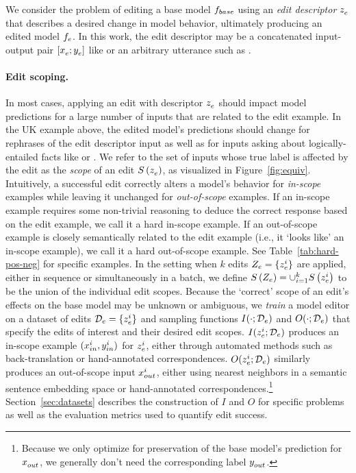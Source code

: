 \documentclass{article}
\begin{document}

We consider the problem of editing a base model $\basemodel$ using an \textit{edit descriptor} $\ze$ that describes a desired change in model behavior, ultimately producing an edited model $\editedmodel$. In this work, the edit descriptor may be a concatenated input-output pair $\editpair$ like  or an arbitrary utterance such as .%



\paragraph{Edit scoping.} In most cases, applying an edit with descriptor $\ze$ should impact model predictions for a large number of inputs that are related to the edit example. In the UK example above, the edited model's predictions should change for rephrases of the edit descriptor input as well as for inputs asking about logically-entailed facts like  or . We refer to the set of inputs whose true label is affected by the edit as the \textit{scope} of an edit $\scope{\ze}$, as visualized in Figure~\ref{fig:equiv}. Intuitively, a successful edit correctly alters a model's behavior for \textit{in-scope} examples while leaving it unchanged for \textit{out-of-scope} examples. If an in-scope example requires some non-trivial reasoning to deduce the correct response based on the edit example, we call it a hard in-scope example. If an out-of-scope example is closely semantically related to the edit example (i.e., it `looks like' an in-scope example), we call it a hard out-of-scope example. See Table~\ref{tab:hard-pos-neg} for specific examples. In the setting when $k$ edits $\edits = \{\ze[i]\}$ are applied, either in sequence or simultaneously in a batch, we define $\scope{\edits} = \cup_{i=1}^k \scope{\ze[i]}$ to be the union of the individual edit scopes. Because the `correct' scope of an edit's effects on the base model may be unknown or ambiguous, we \textit{train} a model editor on a dataset of edits $\editdata =\{\ze[i]\}$ and sampling functions $I(\cdot; \editdata)$ and $O(\cdot; \editdata)$ that specify the edits of interest and their desired edit scopes. $I(\ze[i]; \editdata)$ produces an in-scope example $(\xtest[i], \ytest[i])$ for $\ze[i]$, either through automated methods such as back-translation or hand-annotated correspondences. $O(\ze[i]; \editdata)$ similarly produces an out-of-scope input $\xloc[i]$, either using nearest neighbors in a semantic sentence embedding space or hand-annotated correspondences.\footnote{Because we only optimize for preservation of the base model's prediction for $\xloc$, we generally don't need the corresponding label $\yloc$.} Section~\ref{sec:datasets} describes the construction of $I$ and $O$ for specific problems as well as the evaluation metrics used to quantify edit success.
\end{document}
